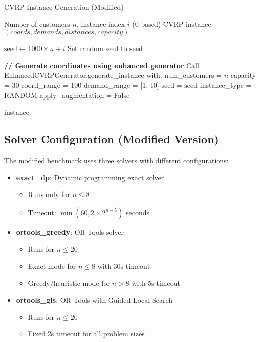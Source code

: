 \begin{algorithm}
\caption{CVRP Instance Generation (Modified)}
\begin{algorithmic}[1]
\REQUIRE Number of customers $n$, instance index $i$ (0-based)
\ENSURE CVRP instance $(coords, demands, distances, capacity)$

\STATE $\text{seed} \leftarrow 1000 \times n + i$
\STATE Set random seed to $\text{seed}$

\STATE \textbf{// Generate coordinates using enhanced generator}
\STATE Call EnhancedCVRPGenerator.generate\_instance with:
\STATE \quad num\_customers = $n$
\STATE \quad capacity = 30
\STATE \quad coord\_range = 100
\STATE \quad demand\_range = [1, 10]
\STATE \quad seed = $\text{seed}$
\STATE \quad instance\_type = RANDOM
\STATE \quad apply\_augmentation = False

\RETURN instance
\end{algorithmic}
\end{algorithm}

\subsection{Solver Configuration (Modified Version)}

The modified benchmark uses three solvers with different configurations:

\begin{itemize}
    \item \textbf{exact\_dp}: Dynamic programming exact solver
        \begin{itemize}
            \item Runs only for $n \leq 8$
            \item Timeout: $\min(60, 2 \times 2^{n-5})$ seconds
        \end{itemize}
    \item \textbf{ortools\_greedy}: OR-Tools solver
        \begin{itemize}
            \item Runs for $n \leq 20$
            \item Exact mode for $n \leq 8$ with 30s timeout
            \item Greedy/heuristic mode for $n > 8$ with 5s timeout
        \end{itemize}
    \item \textbf{ortools\_gls}: OR-Tools with Guided Local Search
        \begin{itemize}
            \item Runs for $n \leq 20$
            \item Fixed 2s timeout for all problem sizes
        \end{itemize}
\end{itemize}
